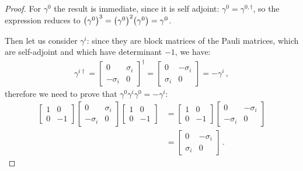 \documentclass[main.tex]{subfiles}
\begin{document}
\begin{proof}
For \(\gamma^{0}\) the result is immediate, since it is self adjoint: \(\gamma^{0} = \gamma^{0, \dag}\), so the expression reduces to \(\qty(\gamma^{0})^3 = \qty(\gamma^{0})^2 \qty(\gamma^{0}) = \gamma^{0}\).

Then let us consider \(\gamma^{i}\): since they are block matrices of the Pauli matrices, which are self-adjoint and which have determinant \(-1\), we have:
%
\begin{align}
\gamma^{i \dag} = \left[\begin{array}{cc}
0 & \sigma_{i} \\ 
- \sigma_{i} & 0
\end{array}\right] ^\dag = 
\left[\begin{array}{cc}
0 & - \sigma_{i} \\ 
\sigma_{i} & 0
\end{array}\right] = - \gamma^{i}
\,,
\end{align}
%
therefore we need to prove that \(\gamma^{0} \gamma^{i} \gamma^{0} = -\gamma^{i}\): 
%
\begin{align}
\left[\begin{array}{cc}
1 & 0 \\ 
0 & -1
\end{array}\right]
\left[\begin{array}{cc}
0 & \sigma_{i} \\ 
-\sigma_{i} & 0
\end{array}\right]
\left[\begin{array}{cc}
1 & 0 \\ 
0 & -1
\end{array}\right] &= 
\left[\begin{array}{cc}
1 & 0 \\ 
0 & -1
\end{array}\right]
\left[\begin{array}{cc}
0 & -\sigma_{i} \\ 
- \sigma_{i} & 0
\end{array}\right]  \\
&= 
\left[\begin{array}{cc}
0 & - \sigma_{i} \\ 
\sigma_{i} & 0
\end{array}\right]
\,.
\end{align}
\end{proof}
\end{document}
